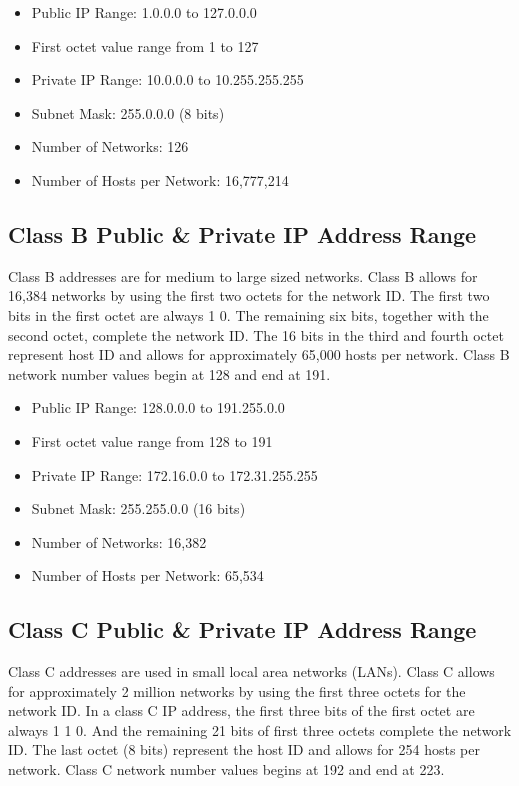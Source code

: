 \documentclass[a4paper,12pt]{book}
\begin{document}
\begin{itemize}
\item{Public IP Range: 1.0.0.0 to 127.0.0.0}
\item{First octet value range from 1 to 127}
\item{Private IP Range: 10.0.0.0 to 10.255.255.255}
\item{Subnet Mask: 255.0.0.0 (8 bits)}
\item{Number of Networks: 126}
\item{Number of Hosts per Network: 16,777,214}
\end{itemize}
 \clearpage
\subsection{Class B Public & Private IP Address Range}
Class B addresses are for medium to large sized networks. Class B allows for 16,384 networks by using the first two octets for the network ID. The first two bits in the first octet are always 1 0. The remaining six bits, together with the second octet, complete the network ID. The 16 bits in the third and fourth octet represent host ID and allows for approximately 65,000 hosts per network. Class B network number values begin at 128 and end at 191.

\begin{itemize}
\item{Public IP Range: 128.0.0.0 to 191.255.0.0}
\item{First octet value range from 128 to 191}
\item{Private IP Range: 172.16.0.0 to 172.31.255.255}
\item{Subnet Mask: 255.255.0.0 (16 bits)}
\item{Number of Networks: 16,382}
\item{Number of Hosts per Network: 65,534}
\end{itemize}

\subsection{Class C Public & Private IP Address Range}
Class C addresses are used in small local area networks (LANs). Class C allows for approximately 2 million networks by using the first three octets for the network ID. In a class C IP address, the first three bits of the first octet are always 1 1 0. And the remaining 21 bits of first three octets complete the network ID. The last octet (8 bits) represent the host ID and allows for 254 hosts per network. Class C network number values begins at 192 and end at 223.
\end{document}
